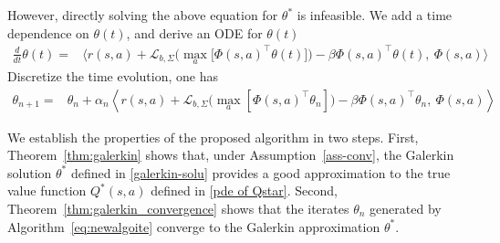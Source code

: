 \documentclass[12pt]{article}
\def\th{\theta}
\def\th{\theta}
\def\mL{\mathcal{L}_{b,\Sigma}}
\def\la{\left\langle}
\def\ra{\right\rangle}
\begin{document}
However, directly solving the above equation for $\th^*$ is infeasible. We add a time dependence on $\theta(t)$, and derive an ODE for $\th(t)$
\begin{equation*}
\begin{aligned}
 \frac{d}{dt}\theta(t) 
=&
\big\langle 
r(s,a) 
+ \mL \Big(\max_a \big[\Phi(s,a)^\top \theta(t)\big]\Big) - \beta\Phi(s,a)^\top \theta(t),
\ \Phi(s,a)
\big\rangle       
\end{aligned}
\end{equation*}
Discretize the time evolution, one has
\begin{equation}\label{eq:newalgoite}
\begin{aligned}
\theta_{n+1} =& \theta_n  + \alpha_n \la  r(s,a) + \mL \Big(\max_a [\Phi(s,a)^\top \theta_n]\Big)-\beta\Phi(s,a)^\top \theta_n, \ \Phi(s,a) \ra
\end{aligned}
\end{equation}

We establish the properties of the proposed algorithm in two steps. First, Theorem~\ref{thm:galerkin} shows that, under Assumption~\ref{ass-conv}, the Galerkin solution $\theta^*$ defined in \eqref{galerkin-solu} provides a good approximation to the true value function $Q^*(s,a)$ defined in \eqref{pde of Qstar}. Second, Theorem~\ref{thm:galerkin_convergence} shows that the iterates $\theta_n$ generated by Algorithm~\eqref{eq:newalgoite} converge to the Galerkin approximation $\theta^*$.
\end{document}
